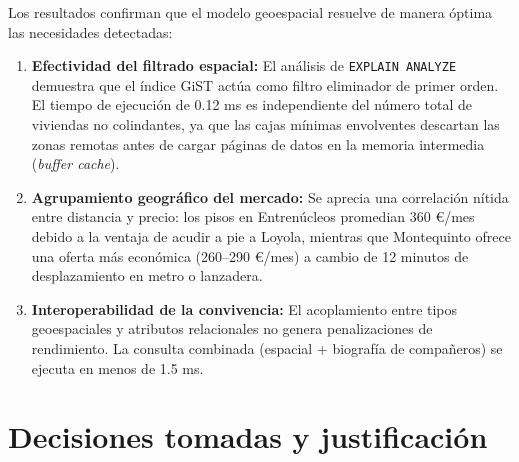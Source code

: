 \documentclass[a4paper,12pt]{article}
\begin{document}
Los resultados confirman que el modelo geoespacial resuelve de manera óptima las necesidades detectadas:
\begin{enumerate}[leftmargin=1.0cm]
  \item \textbf{Efectividad del filtrado espacial:} El análisis de \texttt{EXPLAIN ANALYZE} demuestra que el índice GiST actúa como filtro eliminador de primer orden. El tiempo de ejecución de 0.12 ms es independiente del número total de viviendas no colindantes, ya que las cajas mínimas envolventes descartan las zonas remotas antes de cargar páginas de datos en la memoria intermedia (\textit{buffer cache}).
  \item \textbf{Agrupamiento geográfico del mercado:} Se aprecia una correlación nítida entre distancia y precio: los pisos en Entrenúcleos promedian 360 \euro{}/mes debido a la ventaja de acudir a pie a Loyola, mientras que Montequinto ofrece una oferta más económica (260--290 \euro{}/mes) a cambio de 12 minutos de desplazamiento en metro o lanzadera.
  \item \textbf{Interoperabilidad de la convivencia:} El acoplamiento entre tipos geoespaciales y atributos relacionales no genera penalizaciones de rendimiento. La consulta combinada (espacial + biografía de compañeros) se ejecuta en menos de 1.5 ms.
\end{enumerate}

\section{Decisiones tomadas y justificación}
\end{document}

